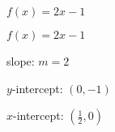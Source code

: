 {$f(x) = 2x - 1$}
{$f(x) =2x-1$

slope: $m = 2$ 

$y$-intercept:  $(0,-1)$

$x$-intercept: $\left(\frac{1}{2}, 0 \right)$ 
\begin{center}
\end{center}}